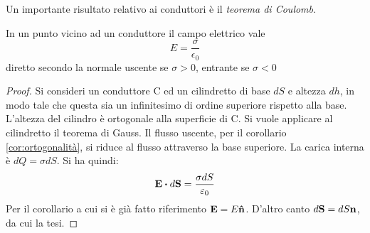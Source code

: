 Un importante risultato relativo ai conduttori è il \textit{teorema di Coulomb}.
\begin{thm}
    In un punto vicino ad un conduttore il campo elettrico vale
    \[
        E=\frac{\sigma}{\epsilon_0}
    \]
    diretto secondo la normale uscente se $\sigma>0$, entrante se $\sigma<0$
\end{thm}
\begin{proof}
    Si consideri un conduttore C ed un cilindretto di base $dS$ e altezza $dh$, in modo tale che questa sia un infinitesimo
    di ordine superiore rispetto alla base. L'altezza del cilindro è ortogonale alla superficie di C. Si vuole applicare
    al cilindretto il teorema di Gauss. Il flusso uscente, per il corollario \ref{cor:ortogonalità}, si riduce al
    flusso attraverso la base superiore. La carica interna è $dQ=\sigma dS$.
    Si ha quindi:
    \[
        \vb{E}\vdot d\vb{S}=\frac{\sigma dS}{\epsilon_0}
    \]
    Per il corollario a cui si è già fatto riferimento $\vb{E}=E\vu{n}$. D'altro canto $d\vb{S}=dS\vb{n}$, da cui la tesi.
\end{proof}

